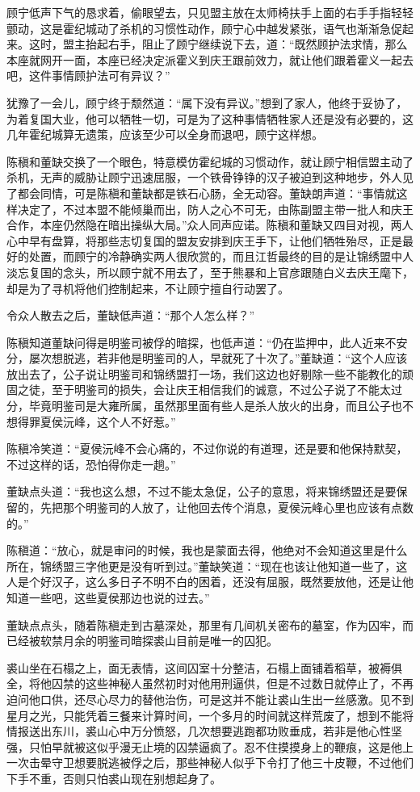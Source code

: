 顾宁低声下气的恳求着，偷眼望去，只见盟主放在太师椅扶手上面的右手手指轻轻颤动，这是霍纪城动了杀机的习惯性动作，顾宁心中越发紧张，语气也渐渐急促起来。这时，盟主抬起右手，阻止了顾宁继续说下去，道：“既然顾护法求情，那么本座就网开一面，本座已经决定派霍义到庆王跟前效力，就让他们跟着霍义一起去吧，这件事情顾护法可有异议？”

犹豫了一会儿，顾宁终于颓然道：“属下没有异议。”想到了家人，他终于妥协了，为着复国大业，他可以牺牲一切，可是为了这种事情牺牲家人还是没有必要的，这几年霍纪城算无遗策，应该至少可以全身而退吧，顾宁这样想。

陈稹和董缺交换了一个眼色，特意模仿霍纪城的习惯动作，就让顾宁相信盟主动了杀机，无声的威胁让顾宁迅速屈服，一个铁骨铮铮的汉子被迫到这种地步，外人见了都会同情，可是陈稹和董缺都是铁石心肠，全无动容。董缺朗声道：“事情就这样决定了，不过本盟不能倾巢而出，防人之心不可无，由陈副盟主带一批人和庆王合作，本座仍然隐在暗出操纵大局。”众人同声应诺。陈稹和董缺又四目对视，两人心中早有盘算，将那些志切复国的盟友安排到庆王手下，让他们牺牲殆尽，正是最好的处置，而顾宁的冷静确实两人很欣赏的，而且江哲最终的目的是让锦绣盟中人淡忘复国的念头，所以顾宁就不用去了，至于熊暴和上官彦跟随白义去庆王麾下，却是为了寻机将他们控制起来，不让顾宁擅自行动罢了。

令众人散去之后，董缺低声道：“那个人怎么样？”

陈稹知道董缺问得是明鉴司被俘的暗探，也低声道：“仍在监押中，此人近来不安分，屡次想脱逃，若非他是明鉴司的人，早就死了十次了。”董缺道：“这个人应该放出去了，公子说让明鉴司和锦绣盟打一场，我们这边也好剔除一些不能教化的顽固之徒，至于明鉴司的损失，会让庆王相信我们的诚意，不过公子说了不能太过分，毕竟明鉴司是大雍所属，虽然那里面有些人是杀人放火的出身，而且公子也不想得罪夏侯沅峰，这个人不好惹。”

陈稹冷笑道：“夏侯沅峰不会心痛的，不过你说的有道理，还是要和他保持默契，不过这样的话，恐怕得你走一趟。”

董缺点头道：“我也这么想，不过不能太急促，公子的意思，将来锦绣盟还是要保留的，先把那个明鉴司的人放了，让他回去传个消息，夏侯沅峰心里也应该有点数的。”

陈稹道：“放心，就是审问的时候，我也是蒙面去得，他绝对不会知道这里是什么所在，锦绣盟三字他更是没有听到过。”董缺笑道：“现在也该让他知道一些了，这人是个好汉子，这么多日子不明不白的困着，还没有屈服，既然要放他，还是让他知道一些吧，这些夏侯那边也说的过去。”

董缺点点头，随着陈稹走到古墓深处，那里有几间机关密布的墓室，作为囚牢，而已经被软禁月余的明鉴司暗探裘山目前是唯一的囚犯。

裘山坐在石榻之上，面无表情，这间囚室十分整洁，石榻上面铺着稻草，被褥俱全，将他囚禁的这些神秘人虽然初时对他用刑逼供，但是不过数日就停止了，不再迫问他口供，还尽心尽力的替他治伤，可是这并不能让裘山生出一丝感激。见不到星月之光，只能凭着三餐来计算时间，一个多月的时间就这样荒废了，想到不能将情报送出东川，裘山心中万分愤怒，几次想要逃跑都功败垂成，若非是他心性坚强，只怕早就被这似乎漫无止境的囚禁逼疯了。忍不住摸摸身上的鞭痕，这是他上一次击晕守卫想要脱逃被俘之后，那些神秘人似乎下令打了他三十皮鞭，不过他们下手不重，否则只怕裘山现在别想起身了。

